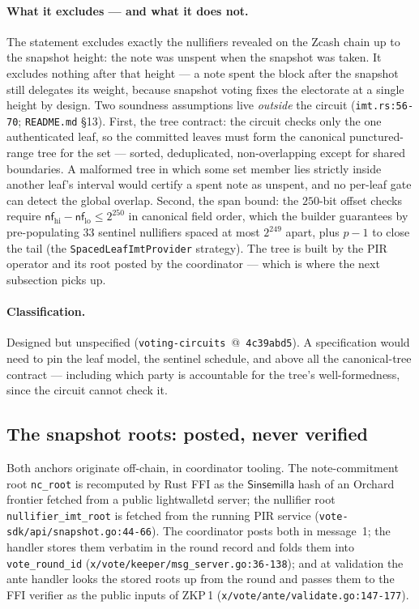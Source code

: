 \documentclass[11pt,a4paper]{article}
\theoremstyle{definition}
\newcommand{\nfsym}{\mathsf{nf}}
\newcommand{\Sinsemilla}{\ensuremath{\mathsf{Sinsemilla}}}
\begin{document}
\paragraph{What it excludes --- and what it does not.} The statement
excludes exactly the nullifiers revealed on the Zcash chain up to the
snapshot height: the note was unspent when the snapshot was taken. It
excludes nothing after that height --- a note spent the block after the
snapshot still delegates its weight, because snapshot voting fixes the
electorate at a single height by design. Two soundness assumptions live
\emph{outside} the circuit (\texttt{imt.rs:56-70};
\texttt{README.md} \S13). First, the tree contract: the circuit checks
only the one authenticated leaf, so the committed leaves must form the
canonical punctured-range tree for the set --- sorted, deduplicated,
non-overlapping except for shared boundaries. A malformed tree in which
some set member lies strictly inside another leaf's interval would certify
a spent note as unspent, and no per-leaf gate can detect the global
overlap. Second, the span bound: the $250$-bit offset checks require
$\nfsym_{\mathrm{hi}} - \nfsym_{\mathrm{lo}} \le 2^{250}$ in canonical
field order, which the builder guarantees by pre-populating $33$ sentinel
nullifiers spaced at most $2^{249}$ apart, plus $p-1$ to close the tail
(the \texttt{SpacedLeafImtProvider} strategy). The tree is built by the
PIR operator and its root posted by the coordinator --- which is where the
next subsection picks up.

\paragraph{Classification.} Designed but unspecified
(\texttt{voting-circuits}~@~\texttt{4c39abd5}). A specification would need
to pin the leaf model, the sentinel schedule, and above all the
canonical-tree contract --- including which party is accountable for the
tree's well-formedness, since the circuit cannot check it.

\subsection{The snapshot roots: posted, never verified}
\label{sec:vote-snapshot}

Both anchors originate off-chain, in coordinator tooling. The
note-commitment root \texttt{nc\_root} is recomputed by Rust FFI as the
\Sinsemilla{} hash of an Orchard frontier fetched from a public
lightwalletd server; the nullifier root \texttt{nullifier\_imt\_root} is
fetched from the running PIR service
(\texttt{vote-sdk/api/snapshot.go:44-66}). The coordinator posts both in
message~1; the handler stores them verbatim in the round record and folds
them into \texttt{vote\_round\_id}
(\texttt{x/vote/keeper/msg\_server.go:36-138}); and at validation the ante
handler looks the stored roots up from the round and passes them to the
FFI verifier as the public inputs of ZKP\,1
(\texttt{x/vote/ante/validate.go:147-177}).
\end{document}
